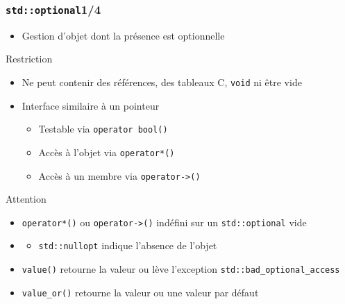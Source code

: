 \documentclass[C++.tex]{subfiles}
\begin{document}
\begin{frame}[fragile]
	\frametitle{\lstinline|std::optional|\titlehfill{}1/4}
	\begin{itemize}
		\item Gestion d'objet dont la présence est optionnelle
	\end{itemize}

	\begin{alertblock}{Restriction}
		\begin{itemize}
			\item Ne peut contenir des références, des tableaux C, \lstinline|void| ni être vide
		\end{itemize}
	\end{alertblock}

	\begin{itemize}
		\item Interface similaire à un pointeur
		\begin{itemize}
			\item Testable via \lstinline|operator bool()|
			\item Accès à l'objet via \lstinline|operator*()|
			\item Accès à un membre via \lstinline|operator->()|
		\end{itemize}
	\end{itemize}

	\begin{alertblock}{Attention}
		\begin{itemize}
			\item \lstinline|operator*()| ou \lstinline|operator->()| indéfini sur un \lstinline|std::optional| vide
		\end{itemize}
	\end{alertblock}

	\begin{itemize}
		\item [] \begin{itemize}
			\item \lstinline|std::nullopt| indique l'absence de l'objet
		\end{itemize}

		\item \lstinline|value()| retourne la valeur ou lève l'exception \lstinline|std::bad_optional_access|
		\item \lstinline|value_or()| retourne la valeur ou une valeur par défaut
	\end{itemize}
\end{frame}
\end{document}
